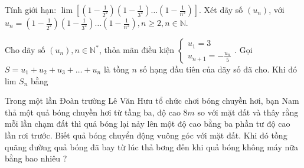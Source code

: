 \begin{bt}%
	Tính giới hạn: $\lim \left[\left(1-\frac{1}{2^2}\right)\left(1-\frac{1}{3^2}\right) \ldots\left(1-\frac{1}{n^2}\right)\right]$.
	Xét dãy số $\left(u_n\right)$, với $u_n=\left(1-\frac{1}{2^2}\right)\left(1-\frac{1}{3^2}\right) \ldots\left(1-\frac{1}{n^2}\right), n \geq 2, n \in \mathbb{N}$.
\end{bt}
\begin{bt}%
	
	Cho dãy số $\left(u_n\right), n \in \mathbb{N}^*$, thỏa mãn điều kiện $\left\{\begin{array}{c}u_1=3 \\ u_{n+1}=-\frac{u_n}{5}\end{array}\right.$. Gọi $S=u_1+u_2+u_3+\ldots+u_n$ là tồng $n$ số hạng đầu tiên của dãy số đã cho. Khi đó lim $S_n$ bằng
\end{bt}
\begin{bt}%
	Trong một lần Đoàn trường Lê Văn Hưu tổ chức chơi bóng chuyền hơi, bạn Nam thả một quả bóng chuyền hơi từ tầng ba, độ cao $8 m$ so với mặt đất và thây rằng mỗi lần chạm đất thì quả bóng lại nảy lên một độ cao bằng ba phần tư độ cao lần rơi trước. Biết quả bóng chuyển động vuông góc với mặt đất. Khi đó tồng quãng đường quả bóng đã bay từ lúc thả bơng đến khi quả bóng không máy nữa bằng bao nhiêu ?
\end{bt}
